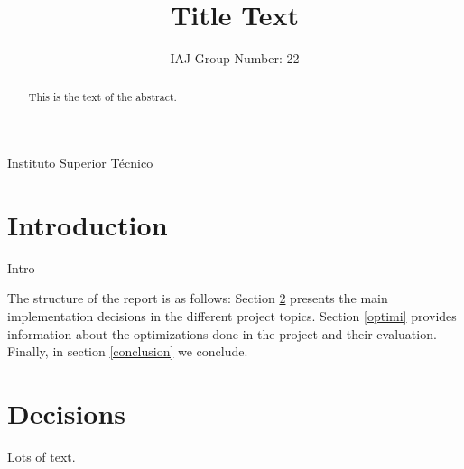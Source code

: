 \documentclass{sigplanconf}[10pt]
\begin{document}
\setlength{\pdfpageheight}{\paperheight}
\setlength{\pdfpagewidth}{\paperwidth}





\title{Title Text}
\subtitle{IAJ Group Number: 22}

           {Instituto Superior Técnico}


\maketitle

\begin{abstract}
This is the text of the abstract.
\end{abstract}



\section{Introduction}

Intro

The structure of the report is as follows: Section \ref{decisions} presents the main implementation decisions in the different project topics. Section \ref{optimi} provides information about the optimizations done in the project and their evaluation. Finally, in section \ref{conclusion} we conclude.

\section{Decisions}
\label{decisions}
Lots of text.
\end{document}
